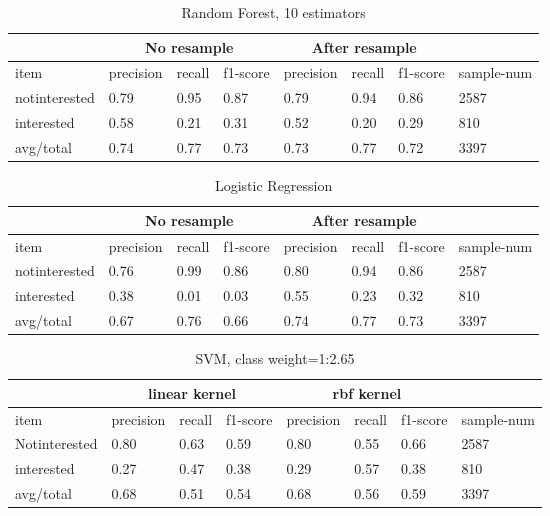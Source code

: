\documentclass{article} %
\begin{document}
\begin{table}[H]
\caption{Random Forest, 10 estimators}
\label{sample-table}
\begin{center}
\begin{tabular}{|l|l|l|l|l|l|l|l|}
\hline 
\textbf{ } & \multicolumn{3}{|c|}{\textbf{No resample}} & \multicolumn{3}{|c|}{\textbf{After resample}} &\textbf{ } \\ \hline
item	&precision	&recall	&f1-score &precision	&recall	&f1-score 	&sample-num\\ \hline
notinterested		&0.79      &0.95      &0.87 	&0.79      &0.94      &0.86      &2587\\ \hline
interested			&0.58      &0.21      &0.31 	&0.52      &0.20      &0.29      &810\\  \hline
avg/total			&0.74      &0.77      &0.73		&0.73      &0.77      &0.72      &3397\\ \hline
\end{tabular}
\end{center}
\end{table}

\begin{table}[H]
\caption{Logistic Regression}
\label{sample-table}
\begin{center}
\begin{tabular}{|l|l|l|l|l|l|l|l|}
\hline 
\textbf{ } & \multicolumn{3}{|c|}{\textbf{No resample}} & \multicolumn{3}{|c|}{\textbf{After resample}} &\textbf{ } \\ \hline
item	&precision	&recall	&f1-score &precision	&recall	&f1-score 	&sample-num\\ \hline
notinterested	&0.76      &0.99      &0.86 &0.80      &0.94      &0.86      &2587\\ \hline
interested		&0.38      &0.01      &0.03 &0.55      &0.23      &0.32      &810\\ \hline
avg/total		&0.67      &0.76      &0.66 &0.74      &0.77      &0.73      &3397\\ \hline
\end{tabular}
\end{center}
\end{table}

\begin{table}[H]
\caption{SVM, class weight=1:2.65}
\label{sample-table}
\begin{center}
\begin{tabular}{|l|l|l|l|l|l|l|l|}
\hline 
\textbf{ } & \multicolumn{3}{|c|}{\textbf{linear kernel}} & \multicolumn{3}{|c|}{\textbf{rbf kernel}} &\textbf{ } \\ \hline
item	&precision	&recall	&f1-score &precision	&recall	&f1-score 	&sample-num\\ \hline
Notinterested		&0.80	&0.63	&0.59	 &0.80   &0.55   &0.66  &2587\\  \hline
interested			&0.27	&0.47	&0.38	 &0.29   &0.57   &0.38    &810\\ \hline
avg/total			&0.68	&0.51	&0.54	 &0.68   &0.56   &0.59    &3397\\ \hline
\end{tabular}
\end{center}
\end{table}
\end{document}
